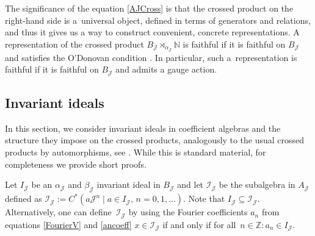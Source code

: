 \documentclass[pdftex]{sigma}
\newcommand{\N}{{\mathbb N}}
\newcommand{\Z}{{\mathbb Z}}
\newcommand{\jcal}{{\mathcal J}}
\newcommand{\fancyI}{\mathcal{I}}
\newcommand{\fancyJ}{\mathcal{J}}
\numberwithin{equation}{section}
\begin{document}
The significance of the equation \eqref{AJCross} is that the crossed product on the right-hand side is a~universal object, defined in terms of generators and relations, and thus it gives us a way to construct convenient, concrete representations. A representation of the crossed product ${B_\fancyJ \rtimes_{\alpha_\fancyJ} \N}$ is faithful if it is faithful on $B_\fancyJ$ and satisfies the O'Donovan condition \cite{BKR}. In particular, such a~representation is faithful if it is faithful on $B_\fancyJ$ and admits a gauge action.

\subsection{Invariant ideals}
 In this section, we consider invariant ideals in coefficient algebras and the structure they impose on the crossed products, analogously to the usual crossed products by automorphisms, see \cite[Section~3.4]{Williams}. While this is standard material, for completeness we provide short proofs.

Let $I_\mathcal{J}$ be an $\alpha_\jcal$ and $\beta_\jcal$ invariant ideal in $B_\mathcal{J}$ and let $\mathcal{I}_\jcal$ be the subalgebra in $A_\jcal$ defined as
$
\mathcal{I}_\jcal := C^*(a\jcal^n \mid a\in I_\jcal,\, n=0,1,\dots)$.
Note that $I_\fancyJ \subseteq \fancyI_\fancyJ$. Alternatively, one can define~$\mathcal{I}_\jcal$ by using the Fourier coefficients $a_n$ from equations \eqref{FourierV} and \eqref{ancoeff}
$
x\in \mathcal{I}_\jcal$ if and only if for all~${n\in\Z\colon a_n\in I_\mathcal{J}}$.
\end{document}
